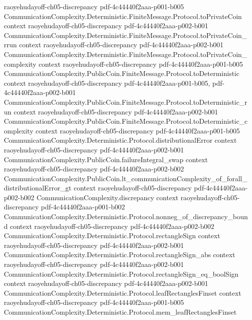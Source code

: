 \begin{theorem}
  {raoyehudayoff-ch05-discrepancy}
  {pdf-4c44440f2aaa-p001-b005}
\proofstep
  {CommunicationComplexity.Deterministic.FiniteMessage.Protocol.toPrivateCoin}
  {context}
  {raoyehudayoff-ch05-discrepancy}
  {pdf-4c44440f2aaa-p002-b001}
\proofstep
  {CommunicationComplexity.Deterministic.FiniteMessage.Protocol.toPrivateCoin_rrun}
  {context}
  {raoyehudayoff-ch05-discrepancy}
  {pdf-4c44440f2aaa-p002-b001}
\proofstep
  {CommunicationComplexity.Deterministic.FiniteMessage.Protocol.toPrivateCoin_complexity}
  {context}
  {raoyehudayoff-ch05-discrepancy}
  {pdf-4c44440f2aaa-p001-b005}
\proofstep
  {CommunicationComplexity.PublicCoin.FiniteMessage.Protocol.toDeterministic}
  {context}
  {raoyehudayoff-ch05-discrepancy}
  {pdf-4c44440f2aaa-p001-b005,
    pdf-4c44440f2aaa-p002-b001}
\proofstep
  {CommunicationComplexity.PublicCoin.FiniteMessage.Protocol.toDeterministic_run}
  {context}
  {raoyehudayoff-ch05-discrepancy}
  {pdf-4c44440f2aaa-p002-b001}
\proofstep
  {CommunicationComplexity.PublicCoin.FiniteMessage.Protocol.toDeterministic_complexity}
  {context}
  {raoyehudayoff-ch05-discrepancy}
  {pdf-4c44440f2aaa-p001-b005}
\proofstep
  {CommunicationComplexity.Deterministic.Protocol.distributionalError}
  {context}
  {raoyehudayoff-ch05-discrepancy}
  {pdf-4c44440f2aaa-p002-b001}
\proofstep
  {CommunicationComplexity.PublicCoin.failureIntegral_swap}
  {context}
  {raoyehudayoff-ch05-discrepancy}
  {pdf-4c44440f2aaa-p002-b002}
\proofstep
  {CommunicationComplexity.PublicCoin.lt_communicationComplexity_of_forall_distributionalError_gt}
  {context}
  {raoyehudayoff-ch05-discrepancy}
  {pdf-4c44440f2aaa-p002-b002}
\proofstep
  {CommunicationComplexity.discrepancy}
  {context}
  {raoyehudayoff-ch05-discrepancy}
  {pdf-4c44440f2aaa-p001-b002}
\proofstep
  {CommunicationComplexity.Deterministic.Protocol.nonneg_of_discrepancy_bound}
  {context}
  {raoyehudayoff-ch05-discrepancy}
  {pdf-4c44440f2aaa-p002-b002}
\proofstep
  {CommunicationComplexity.Deterministic.Protocol.rectangleSign}
  {context}
  {raoyehudayoff-ch05-discrepancy}
  {pdf-4c44440f2aaa-p002-b001}
\proofstep
  {CommunicationComplexity.Deterministic.Protocol.rectangleSign_abs}
  {context}
  {raoyehudayoff-ch05-discrepancy}
  {pdf-4c44440f2aaa-p002-b001}
\proofstep
  {CommunicationComplexity.Deterministic.Protocol.rectangleSign_eq_boolSign}
  {context}
  {raoyehudayoff-ch05-discrepancy}
  {pdf-4c44440f2aaa-p002-b001}
\proofstep
  {CommunicationComplexity.Deterministic.Protocol.leafRectanglesFinset}
  {context}
  {raoyehudayoff-ch05-discrepancy}
  {pdf-4c44440f2aaa-p001-b005}
\proofstep
  {CommunicationComplexity.Deterministic.Protocol.mem_leafRectanglesFinset}

\end{theorem}
